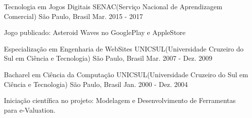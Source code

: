 

\begin{cventries}

  \cventry
    {Tecnologia em Jogos Digitais} %
    {SENAC(Serviço Nacional de Aprendizagem Comercial)} %
    {São Paulo, Brasil} %
    {Mar. 2015 - 2017} %
    {
      \begin{cvitems} %
        \item {Jogo publicado: Asteroid Waves no GooglePlay e AppleStore}
      \end{cvitems}
    }

  \cventry
    {Especialização em Engenharia de WebSites} %
    {UNICSUL(Universidade Cruzeiro do Sul em Ciência e Tecnologia)} %
    {São Paulo, Brasil} %
    {Mar. 2007 - Dez. 2009} %
    {}

  \cventry
    {Bacharel em Ciência da Computação} %
    {UNICSUL(Universidade Cruzeiro do Sul em Ciência e Tecnologia)} %
    {São Paulo, Brasil} %
    {Jan. 2000 - Dez. 2004} %
    {
      \begin{cvitems} %
        \item {Iniciação científica no projeto: Modelagem e Desenvolvimento de Ferramentas para e-Valuation.}
      \end{cvitems}
    }


\end{cventries}
